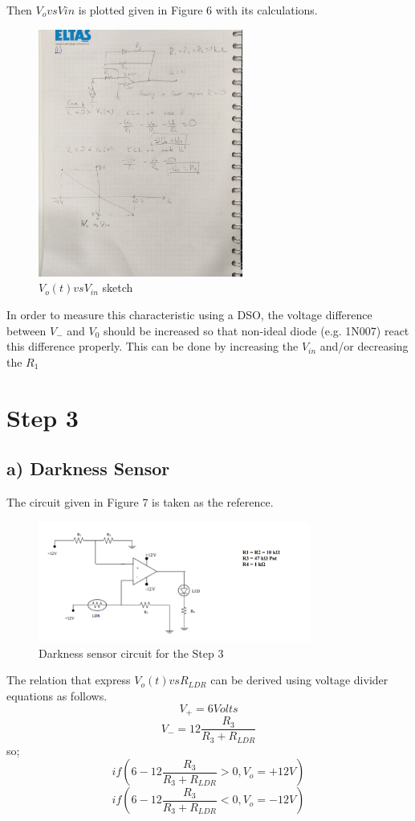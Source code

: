 \documentclass[letterpaper,12pt]{article}
\begin{document}
Then \(V_o vs V{in}\) is plotted given in Figure 6 with its calculations.
\begin{figure}[H]
	\centering
   \includegraphics[width=0.6\textwidth]{2_hand.jpeg}
   \caption{\(V_o(t) vs V_{in}\) sketch}
\end{figure} 
In order to measure this characteristic using a DSO, the voltage difference between \(V_-\) and \(V_0\) should be increased so  that non-ideal diode (e.g. 1N007) react this difference properly. This can be done by increasing the \(V_{in}\) and/or decreasing the \(R_1\) 
\section{Step 3}
\subsection{a) Darkness Sensor}
The circuit given in Figure 7 is taken as the reference.
\begin{figure}[H]
	\centering
   \includegraphics[width=0.8\textwidth]{darkness.png}
   \caption{Darkness sensor circuit for the Step 3}
\end{figure} 
The relation that express \(V_o(t) vs R_{LDR}\) can be derived using voltage divider equations as follows.
\[V_+ = 6 Volts
\]\[
V_- = 12\frac{R_3}{R_3+R_{LDR}}
\]
so;
\[ 
if (6-12\frac{R_3}{R_3+R_{LDR}} > 0, V_o = +12V)
\]\[ 
if (6-12\frac{R_3}{R_3+R_{LDR}} < 0, V_o = -12V)
\]
\end{document}
